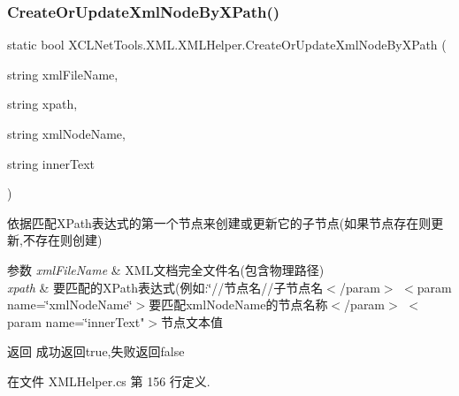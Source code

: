 \subsubsection{\texorpdfstring{Create\+Or\+Update\+Xml\+Node\+By\+X\+Path()}{CreateOrUpdateXmlNodeByXPath()}}
{\footnotesize\ttfamily static bool X\+C\+L\+Net\+Tools.\+X\+M\+L.\+X\+M\+L\+Helper.\+Create\+Or\+Update\+Xml\+Node\+By\+X\+Path (\begin{DoxyParamCaption}\item[{string}]{xml\+File\+Name,  }\item[{string}]{xpath,  }\item[{string}]{xml\+Node\+Name,  }\item[{string}]{inner\+Text }\end{DoxyParamCaption})\hspace{0.3cm}{\ttfamily [static]}}



依据匹配\+X\+Path表达式的第一个节点来创建或更新它的子节点(如果节点存在则更新,不存在则创建) 


\begin{DoxyParams}{参数}
{\em xml\+File\+Name} & X\+M\+L文档完全文件名(包含物理路径)\\
\hline
{\em xpath} & 要匹配的\+X\+Path表达式(例如\+:\char`\"{}//节点名//子节点名$<$/param$>$
$<$param name=\char`\"{}xml\+Node\+Name\char`\"{}$>$要匹配xml\+Node\+Name的节点名称$<$/param$>$
$<$param name=\char`\"{}inner\+Text"$>$节点文本值\\
\hline
\end{DoxyParams}
\begin{DoxyReturn}{返回}
成功返回true,失败返回false
\end{DoxyReturn}


在文件 X\+M\+L\+Helper.\+cs 第 156 行定义.

\mbox{\label{class_x_c_l_net_tools_1_1_x_m_l_1_1_x_m_l_helper_a41eb1023cd0930834f907aaa7ec3e6c1}} 
